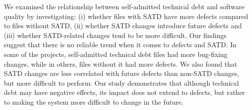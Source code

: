 We examined the relationship between self-admitted technical debt and software quality by investigating: (i) whether files with SATD have more defects compared to files without SATD, (ii) whether SATD changes introduce future defects and (iii) whether SATD-related changes tend to be more difficult. Our findings suggest that there is no reliable trend when it comes to defects and SATD. In some of the projects, self-admitted technical debt files had more bug-fixing changes, while in others, files without it had more defects. We also found that SATD changes are less correlated with future defects than non-SATD changes, but more difficult to perform. 
Our study demonstrates that although technical debt may have negative effects, its impact does not extend to defects, but rather to making the system more difficult to change in the future.

